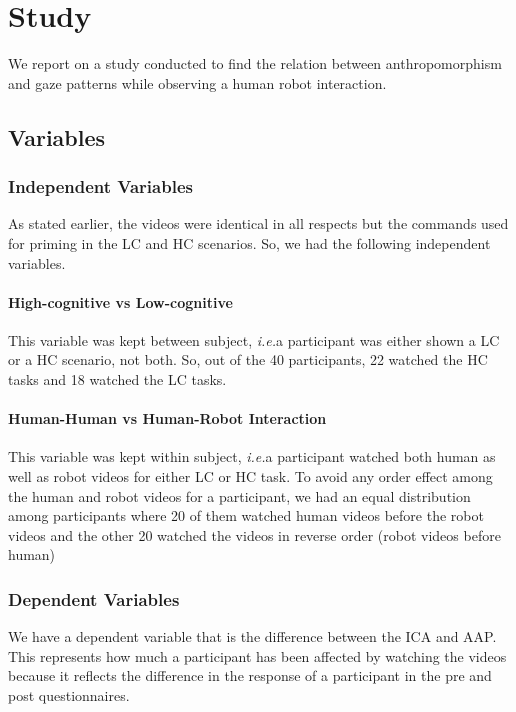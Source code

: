 \documentclass[a4,twocolumn,10pt]{article}
\newcommand{\ie}{{\textit{i.e.\xspace}}}
\begin{document}
\section{Study}

We report on a study conducted to find the relation between anthropomorphism and
gaze patterns while observing a human robot interaction.

\subsection{Variables}

\subsubsection{Independent Variables}

As stated earlier, the videos were identical in all respects but the commands
used for priming in the LC and HC scenarios. So, we had the following
independent variables.

\paragraph{High-cognitive vs Low-cognitive}

This variable was kept between subject, \ie a participant was either shown a
LC or a HC scenario, not both. So, out of the 40 participants, 22 watched the HC
tasks and 18 watched the LC tasks.

\paragraph{Human-Human vs Human-Robot Interaction}

This variable was kept within subject, \ie a participant watched both
human as well as robot videos for either LC or HC task. To avoid any order
effect among the human and robot videos for a participant, we had an equal
distribution among participants where 20 of them watched human videos before the
robot videos and the other 20 watched the videos in reverse order (robot videos
before human) 

\subsubsection{Dependent Variables}

We have a dependent variable that is the difference between the ICA and AAP.
This represents how much a participant has been affected by watching the videos
because it reflects the difference in the response of a participant in the pre
and post questionnaires.
\end{document}
